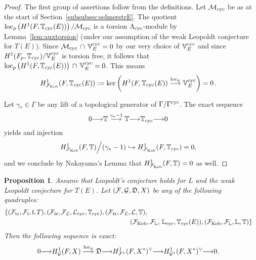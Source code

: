 \documentclass[12pt]{amsart}
\numberwithin{equation}{section}
\newtheorem{prop}[thm]{Proposition}
\begin{document}
\begin{proof}
The first group of assertions follow from the definitions.
Let $\mathcal{M}_{\textup{cyc}}$ be as at the start of Section~\ref{subsubsec:selmerstrE}. The quotient $\textup{loc}_p\left(H^1(F,{\mathbb{T}}_{\textup{cyc}}(E))\right)/\mathcal{M}_{\textup{cyc}}$ is a torsion ${\Lambda}_{\textup{cyc}}$-module by Lemma~\ref{lem:auxtorsion} (under our assumption of the weak Leopoldt conjecture for $T(E)$). Since $\mathcal{M}_{\textup{cyc}}\,\cap\,\mathbb{V}_E^{\textup{cyc}}=0$ by our very choice of $\mathbb{V}_E^{\textup{cyc}}$ and since $H^1(F_p,{\mathbb{T}}_{\textup{cyc}})/\mathbb{V}_E^{\textup{cyc}}$ is torsion free, it follows that $\textup{loc}_p\left(H^1(F,{\mathbb{T}}_{\textup{cyc}}(E))\right) \,\cap\, \mathbb{V}_E^{\textup{cyc}}=0$. This means 
$$H^1_{{\mathcal{F}}_{\textup{Kob}}}(F,{\mathbb{T}}_{\textup{cyc}}(E)):=\ker\left(H^1(F,{\mathbb{T}}_{\textup{cyc}}(E))\stackrel{\textup{loc}_p}{\longrightarrow} \mathbb{V}_E^{\textup{cyc}}\right)=0\,.$$  

Let $\gamma_*\in \Gamma$ be any lift of a topological generator of $\Gamma/\Gamma^{\textup{cyc}}$. The exact sequence
$$0{\longrightarrow} {\mathbb{T}}\stackrel{\gamma_*-1}{\longrightarrow} {\mathbb{T}} {\longrightarrow} {\mathbb{T}}_{\textup{cyc}}{\longrightarrow} 0$$
yields and injection
$$H^1_{{\mathcal{F}}_{\textup{Kob}}}(F,{\mathbb{T}})\Big{/} (\gamma_*-1)\hookrightarrow H^1_{{\mathcal{F}}_{\textup{Kob}}}(F,{\mathbb{T}}_{\textup{cyc}})=0,$$
and we conclude by Nakayama's Lemma that $H^1_{{\mathcal{F}}_{\textup{Kob}}}(F,{\mathbb{T}})=0$ as well.
\end{proof}

\begin{prop}
\label{prop:4termexact}
Assume that Leopoldt's conjecture holds for $L$ and the weak Leopoldt conjecture for $T(E)$. Let $({\mathcal{F}},\mathcal{G},\frak{D}, X)$ be any of the following quadruples: 
\begin{align*}\{({\mathcal{F}}_{\textup{tr}},{\mathcal{F}}_{\frak{l}},\frak{l},T), ({\mathcal{F}}_{\frak{tr}},{\mathcal{F}}_{\mathcal{L}},\frak{\mathcal{L}_{\textup{cyc}}},{\mathbb{T}}_{\textup{cyc}}), ({\mathcal{F}}_{\frak{tr}},{\mathcal{F}}_{\mathcal{L}}, & \,\frak{\mathcal{L}},{\mathbb{T}}), \\&({\mathcal{F}}_{\textup{Kob}},{\mathcal{F}}_{\mathbb{L}},\,\mathbb{L}_{\textup{cyc}},{\mathbb{T}}_{\textup{cyc}}(E)),  ({\mathcal{F}}_{\textup{Kob}},{\mathcal{F}}_{\mathbb{L}},\mathbb{L},{\mathbb{T}})\}\end{align*}
Then the following sequence is exact:
$$0{\longrightarrow}{H^1_{\mathcal{G}}(F,X)}\stackrel{\textup{loc}_p}{\longrightarrow}\frak{D} {\longrightarrow} H^1_{{\mathcal{F}}^*}(F,X^*)^{\vee}{\longrightarrow}{H^1_{\mathcal{G}^*}(F,X^*)^{\vee}}{\longrightarrow} 0.$$
\end{prop}
\end{document}
